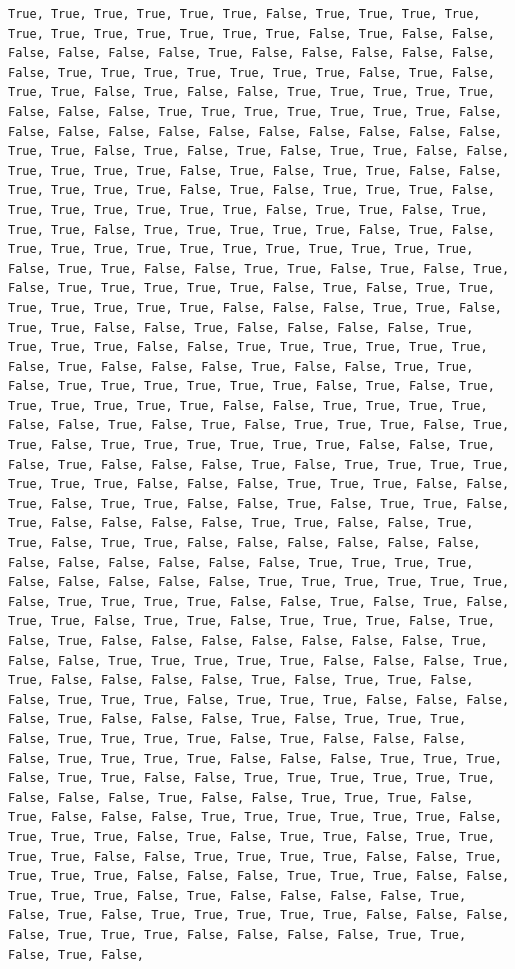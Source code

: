 \documentclass[
  letterpaper,
  DIV=11,
  numbers=noendperiod]{scrartcl}
\begin{document}
\begin{verbatim}
True, True, True, True, True, True, False, True, True, True, True, True, True, True, True, True, True, True, False, True, False, False, False, False, False, False, True, False, False, False, False, False, False, True, True, True, True, True, True, True, False, True, False, True, True, False, True, False, False, True, True, True, True, True, False, False, False, True, True, True, True, True, True, True, False, False, False, False, False, False, False, False, False, False, False, True, True, False, True, False, True, False, True, True, False, False, True, True, True, True, False, True, False, True, True, False, False, True, True, True, True, False, True, False, True, True, True, False, True, True, True, True, True, True, False, True, True, False, True, True, True, False, True, True, True, True, True, False, True, False, True, True, True, True, True, True, True, True, True, True, True, False, True, True, False, False, True, True, False, True, False, True, False, True, True, True, True, True, False, True, False, True, True, True, True, True, True, True, False, False, False, True, True, False, True, True, False, False, True, False, False, False, False, True, True, True, True, False, False, True, True, True, True, True, True, False, True, False, False, False, True, False, False, True, True, False, True, True, True, True, True, True, False, True, False, True, True, True, True, True, True, False, False, True, True, True, True, False, False, True, False, True, False, True, True, True, False, True, True, False, True, True, True, True, True, True, False, False, True, False, True, False, False, False, True, False, True, True, True, True, True, True, True, False, False, False, True, True, True, False, False, True, False, True, True, False, False, True, False, True, True, False, True, False, False, False, False, True, True, False, False, True, True, False, True, True, False, False, False, False, False, False, False, False, False, False, False, False, True, True, True, True, False, False, False, False, False, True, True, True, True, True, True, False, True, True, True, True, False, False, True, False, True, False, True, True, False, True, True, False, True, True, True, False, True, False, True, False, False, False, False, False, False, False, True, False, False, True, True, True, True, True, False, False, False, True, True, False, False, False, False, True, False, True, True, False, False, True, True, True, False, True, True, True, False, False, False, False, True, False, False, False, True, False, True, True, True, False, True, True, True, True, False, True, False, False, False, False, True, True, True, True, False, False, False, True, True, True, False, True, True, False, False, True, True, True, True, True, True, False, False, False, True, False, False, True, True, True, False, True, False, False, False, True, True, True, True, True, True, False, True, True, True, False, True, False, True, True, False, True, True, True, True, False, False, True, True, True, True, False, False, True, True, True, True, False, False, False, True, True, True, False, False, True, True, True, False, True, False, False, False, False, True, False, True, False, True, True, True, True, True, False, False, False, False, True, True, True, False, False, False, False, True, True, False, True, False, 
\end{verbatim}
\end{document}
